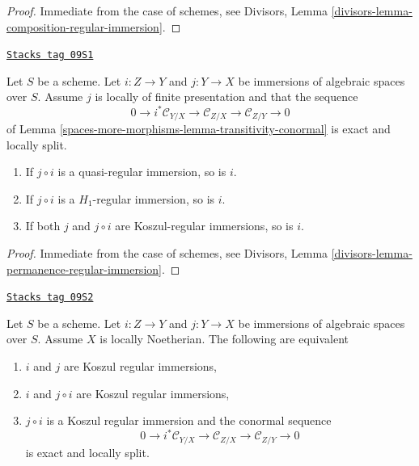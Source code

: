 \begin{proof}
Immediate from the case of schemes, see
Divisors, Lemma \ref{divisors-lemma-composition-regular-immersion}.
\end{proof}

\begin{lemma}
\label{spaces-more-morphisms-lemma-permanence-regular-immersion}
\href{https://stacks.math.columbia.edu/tag/09S1}{\texttt{Stacks tag 09S1}}

Let $S$ be a scheme. Let $i : Z \to Y$ and $j : Y \to X$ be immersions of
algebraic spaces over $S$. Assume $j$ is locally of finite presentation
and that the sequence
$$
0 \to i^*\mathcal{C}_{Y/X} \to
\mathcal{C}_{Z/X} \to
\mathcal{C}_{Z/Y} \to 0
$$
of Lemma \ref{spaces-more-morphisms-lemma-transitivity-conormal} is exact and locally split.
\begin{enumerate}
\item If $j \circ i$ is a quasi-regular immersion, so is $i$.
\item If $j \circ i$ is a $H_1$-regular immersion, so is $i$.
\item If both $j$ and $j \circ i$ are Koszul-regular immersions, so is $i$.
\end{enumerate}
\end{lemma}

\begin{proof}
Immediate from the case of schemes, see
Divisors, Lemma \ref{divisors-lemma-permanence-regular-immersion}.
\end{proof}

\begin{lemma}
\label{spaces-more-morphisms-lemma-extra-permanence-regular-immersion-noetherian}
\href{https://stacks.math.columbia.edu/tag/09S2}{\texttt{Stacks tag 09S2}}

Let $S$ be a scheme. Let $i : Z \to Y$ and $j : Y \to X$ be immersions of
algebraic spaces over $S$. Assume $X$ is locally Noetherian.
The following are equivalent
\begin{enumerate}
\item $i$ and $j$ are Koszul regular immersions,
\item $i$ and $j \circ i$ are Koszul regular immersions,
\item $j \circ i$ is a Koszul regular immersion and the conormal sequence
$$
0 \to i^*\mathcal{C}_{Y/X} \to
\mathcal{C}_{Z/X} \to
\mathcal{C}_{Z/Y} \to 0
$$
is exact and locally split.
\end{enumerate}
\end{lemma}

